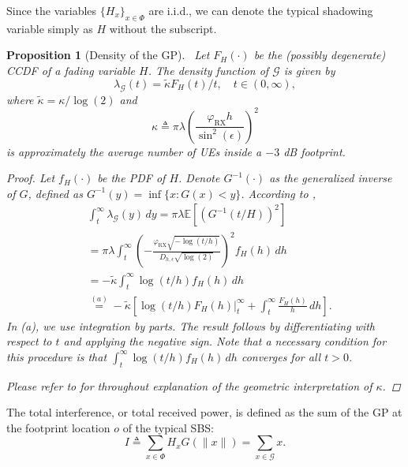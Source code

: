 \documentclass[lettersize,journal]{IEEEtran}
\newtheorem{prop}[theorem]{Proposition}
\begin{document}
Since the variables $\{H_x\}_{x \in \Phi}$ are i.i.d., we can denote the typical shadowing variable simply as $H$ without the subscript.
\begin{prop}[Density of the GP]\
  Let $F_H(\cdot)$ be the (possibly degenerate) CCDF of a fading variable $H$. The density function of $\mathcal{G}$ is given by
  \begin{equation}
    \label{eq:GPdensity}
    \lambda_{\mathcal{G}}(t) = \tilde{\kappa} {F_H(t)}/{t}, \quad t \in (0, \infty),
  \end{equation}
  where $\tilde{\kappa} = {\kappa}/{\log(2)}$ and
  \begin{equation}\kappa \triangleq \pi \lambda \left(\frac{\varphi_{\text{RX}}h}{\sin^2(\epsilon)}\right)^2
    \label{eq:kappa}
  \end{equation}
  is approximately the average number of UEs inside a $-3$ dB footprint.

  
  \begin{proof}
    Let $f_H(\cdot)$ be the PDF of $H$. Denote $G^{-1}(\cdot)$ as the generalized inverse of $G$, defined as $G^{-1}(y) = \inf \{x : G(x) < y\}$. According to \cite[Eq. 4.55]{alma998193414406526},
    \begin{align*}
      &\int_t^{\infty} \lambda_{\mathcal{G}}(y) \, dy = \pi \lambda \mathbb{E}\left[ \left({G^{-1}(t/H)}{}\right)^2 \right] \\
      &= \pi \lambda \int_t^{\infty} \left(-\frac{\varphi_{\text{RX}} \sqrt{-\log(t/h)}}{D_{h,\epsilon} \sqrt{\log(2)}}\right)^2 f_H(h) \, dh \\
      &= -\tilde{\kappa} \int_t^{\infty} \log(t/h) f_H(h) \, dh \\
      &\overset{(a)}{=} -\tilde{\kappa} \left[ \left. \log(t/h) F_H(h) \right|_t^{\infty} + \int_t^{\infty} \frac{F_H(h)}{h} \, dh \right].
    \end{align*}
    In (a), we use integration by parts. The result follows by differentiating with respect to $t$ and applying the negative sign. Note that a necessary condition for this procedure is that $\int_t^{\infty} \log(t/h) f_H(h) \, dh$ converges for all $t > 0$.
    
    Please refer to \cite[Lemma 1]{10909705} for throughout explanation of the geometric interpretation of $\kappa$.
  \end{proof}
\end{prop}





The total interference, or total received power, is defined as the sum of the GP at the footprint location  $\textit{o}$ of the typical SBS:
\begin{equation}
  \label{eq:totpow}
  I \triangleq \sum_{x \in \Phi} H_x G(\|x\|) = \sum_{x \in \mathcal{G}} x.
\end{equation}
\end{document}
